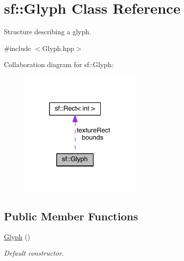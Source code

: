 \hypertarget{classsf_1_1_glyph}{\section{sf\-:\-:Glyph Class Reference}
\label{classsf_1_1_glyph}
}


Structure describing a glyph.  




{\ttfamily \#include $<$Glyph.\-hpp$>$}



Collaboration diagram for sf\-:\-:Glyph\-:
\nopagebreak
\begin{figure}[H]
\begin{center}
\leavevmode
\includegraphics[width=173pt]{classsf_1_1_glyph__coll__graph}
\end{center}
\end{figure}
\subsection*{Public Member Functions}
\begin{DoxyCompactItemize}
\item 
\hyperlink{classsf_1_1_glyph_ab15cfc37eb7b40a94b3b3aedf934010b}{Glyph} ()
\begin{DoxyCompactList}\small\item\em Default constructor. \end{DoxyCompactList}\end{DoxyCompactItemize}
